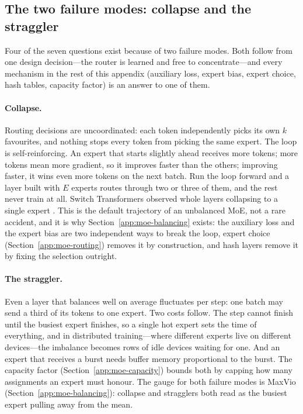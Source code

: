 \subsection{The two failure modes: collapse and the straggler}
\label{app:moe-failures}

Four of the seven questions exist because of two failure modes. Both follow
from one design decision---the router is learned and free to concentrate---and
every mechanism in the rest of this appendix (auxiliary loss, expert bias,
expert choice, hash tables, capacity factor) is an answer to one of them.

\paragraph{Collapse.}
Routing decisions are uncoordinated: each token independently picks its own
$k$ favourites, and nothing stops every token from picking the same expert.
The loop is self-reinforcing. An expert that starts slightly ahead receives
more tokens; more tokens mean more gradient, so it improves faster than the
others; improving faster, it wins even more tokens on the next batch. Run the
loop forward and a layer built with $E$ experts routes through two or three
of them, and the rest never train at all. Switch Transformers observed whole
layers collapsing to a single expert \citep{fedus2021switch}. This is the
default trajectory of an unbalanced MoE, not a rare accident, and it is why
Section~\ref{app:moe-balancing} exists: the auxiliary loss and the expert bias
are two independent ways to break the loop, expert choice
(Section~\ref{app:moe-routing}) removes it by construction, and hash layers
remove it by fixing the selection outright.

\paragraph{The straggler.}
Even a layer that balances well on average fluctuates per step: one batch may
send a third of its tokens to one expert. Two costs follow. The step cannot
finish until the busiest expert finishes, so a single hot expert sets the time
of everything, and in distributed training---where different experts live on
different devices---the imbalance becomes rows of idle devices waiting for
one. And an expert that receives a burst needs buffer memory proportional to
the burst. The capacity factor (Section~\ref{app:moe-capacity}) bounds both
by capping how many assignments an expert must honour. The gauge for both
failure modes is MaxVio (Section~\ref{app:moe-balancing}): collapse and
stragglers both read as the busiest expert pulling away from the mean.

